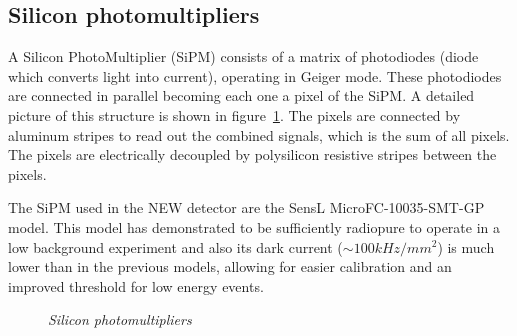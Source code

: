 \subsection{Silicon photomultipliers}\label{sec:sipms}
A Silicon PhotoMultiplier (SiPM) consists of a matrix of photodiodes (diode which converts light into current), operating in Geiger mode. These photodiodes are connected in parallel becoming each one a pixel of the SiPM. A detailed picture of this structure is shown in figure~\ref{fig:sipm}. The pixels are connected by aluminum stripes to read out the combined signals, which is the sum of all pixels. The pixels are electrically decoupled by polysilicon resistive stripes between the pixels. 

The SiPM used in the NEW detector are the SensL MicroFC-10035-SMT-GP model. This model has demonstrated to be sufficiently radiopure to operate in a low background experiment and also its dark current ($\sim100kHz/mm^2$) is much lower than in the previous models, allowing for easier calibration and an improved threshold for low energy events.


\begin{figure}[h!]
  \centering
  \hspace{5mm}             
  \hspace{5mm}             
  \caption{\textit{Silicon photomultipliers}}
  \label{fig:sipm}
\end{figure}
